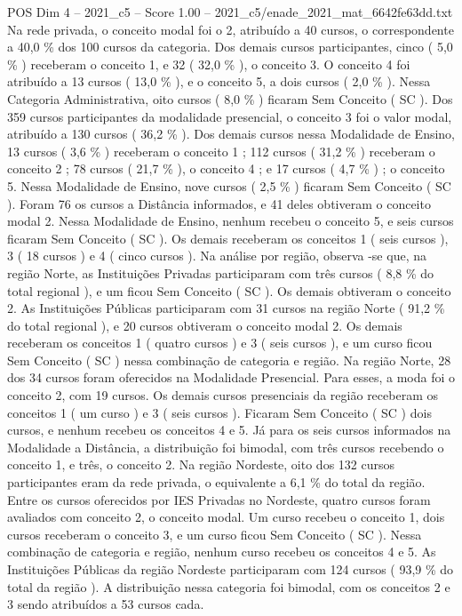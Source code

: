 \begin{textsample}{POS Dim 4 – 2021\_c5 – Score 1.00 – 2021\_c5/enade\_2021\_mat\_6642fe63dd.txt}
Na rede privada, o conceito modal foi o 2, atribuído a 40 cursos, o correspondente a 40,0 \% dos 100 cursos da categoria.
Dos demais cursos participantes, cinco ( 5,0 \% ) receberam o conceito 1, e 32 ( 32,0 \% ), o conceito 3.
O conceito 4 foi atribuído a 13 cursos ( 13,0 \% ), e o conceito 5, a dois cursos ( 2,0 \% ).
Nessa Categoria Administrativa, oito cursos ( 8,0 \% ) ficaram Sem Conceito ( SC ).
Dos 359 cursos participantes da modalidade presencial, o conceito 3 foi o valor modal, atribuído a 130 cursos ( 36,2 \% ).
Dos demais cursos nessa Modalidade de Ensino, 13 cursos ( 3,6 \% ) receberam o conceito 1 ; 112 cursos ( 31,2 \% ) receberam o conceito 2 ; 78 cursos ( 21,7 \% ), o conceito 4 ; e 17 cursos ( 4,7 \% ) ; o conceito 5.
Nessa Modalidade de Ensino, nove cursos ( 2,5 \% ) ficaram Sem Conceito ( SC ).
Foram 76 os cursos a Distância informados, e 41 deles obtiveram o conceito modal 2.
Nessa Modalidade de Ensino, nenhum recebeu o conceito 5, e seis cursos ficaram Sem Conceito ( SC ).
Os demais receberam os conceitos 1 ( seis cursos ), 3 ( 18 cursos ) e 4 ( cinco cursos ).
Na análise por região, observa -se que, na região Norte, as Instituições Privadas participaram com três cursos ( 8,8 \% do total regional ), e um ficou Sem Conceito ( SC ).
Os demais obtiveram o conceito 2.
As Instituições Públicas participaram com 31 cursos na região Norte ( 91,2 \% do total regional ), e 20 cursos obtiveram o conceito modal 2.
Os demais receberam os conceitos 1 ( quatro cursos ) e 3 ( seis cursos ), e um curso ficou Sem Conceito ( SC ) nessa combinação de categoria e região.
Na região Norte, 28 dos 34 cursos foram oferecidos na Modalidade Presencial.
Para esses, a moda foi o conceito 2, com 19 cursos.
Os demais cursos presenciais da região receberam os conceitos 1 ( um curso ) e 3 ( seis cursos ).
Ficaram Sem Conceito ( SC ) dois cursos, e nenhum recebeu os conceitos 4 e 5.
Já para os seis cursos informados na Modalidade a Distância, a distribuição foi bimodal, com três cursos recebendo o conceito 1, e três, o conceito 2.
Na região Nordeste, oito dos 132 cursos participantes eram da rede privada, o equivalente a 6,1 \% do total da região.
Entre os cursos oferecidos por IES Privadas no Nordeste, quatro cursos foram avaliados com conceito 2, o conceito modal.
Um curso recebeu o conceito 1, dois cursos receberam o conceito 3, e um curso ficou Sem Conceito ( SC ).
Nessa combinação de categoria e região, nenhum curso recebeu os conceitos 4 e 5.
As Instituições Públicas da região Nordeste participaram com 124 cursos ( 93,9 \% do total da região ).
A distribuição nessa categoria foi bimodal, com os conceitos 2 e 3 sendo atribuídos a 53 cursos cada.

\end{textsample}
